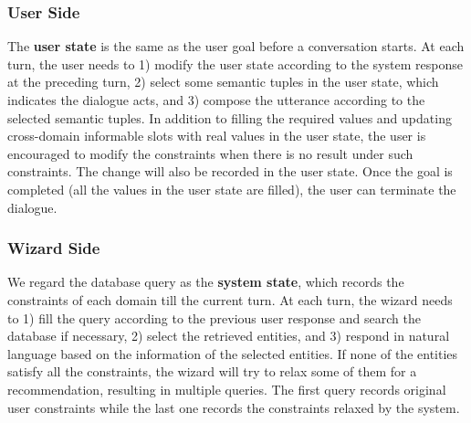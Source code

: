 \subsubsection{User Side}
\label{sec:user-side}
The \textbf{user state} is the same as the user goal before a conversation starts.
At each turn, the user needs to 1) modify the user state according to the system response at the preceding turn, 2) select some semantic tuples in the user state, which indicates the dialogue acts,
and 3) compose the utterance according to the selected semantic tuples. 
In addition to filling the required values and updating cross-domain informable slots with real values in the user state, the user is encouraged to modify the constraints when there is no result under such constraints. 
The change will also be recorded in the user state. Once the goal is completed (all the values in the user state are filled), the user can terminate the dialogue.

\subsubsection{Wizard Side}
\label{sec:3.3.2}
We regard the database query as the \textbf{system state}, which records the constraints of each domain till the current turn. 
At each turn, the wizard needs to 1) fill the query according to the previous user response and search the database if necessary, 2) select the retrieved entities, and 3) respond in natural language based on the information of the selected entities. 
If none of the entities satisfy all the constraints, the wizard will try to relax some of them for a recommendation, resulting in multiple queries. The first query records original user constraints while the last one records the constraints relaxed by the system. 

